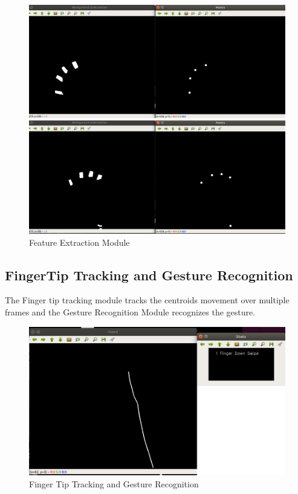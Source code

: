 \documentclass[11pt]{report}
\begin{document}
\begin{figure}[h]
    \includegraphics[width=15cm]{featuretest.png}
    
    \includegraphics[width=15cm]{featuretest2.png}
    \caption{Feature Extraction Module}
\end{figure}

\subsection{FingerTip Tracking and Gesture Recognition}

The Finger tip tracking module tracks the centroids movement over multiple frames and the Gesture Recognition Module recognizes the gesture.

\begin{figure}[H]
    \includegraphics[width=15cm]{gesture.png}
    
    \caption{Finger Tip Tracking and Gesture Recognition}
\end{figure}
\end{document}
